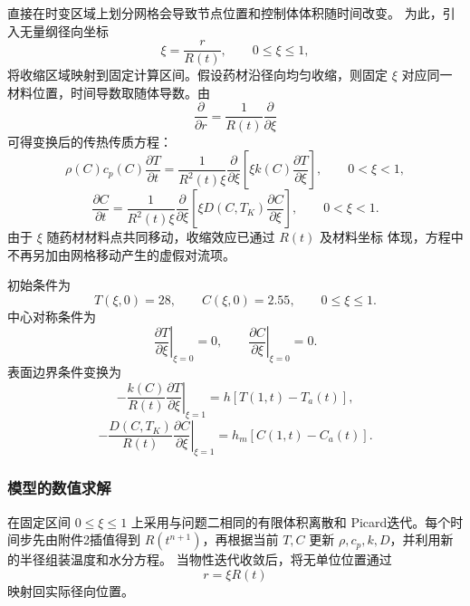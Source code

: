 \documentclass[12pt,a4paper]{article}
\begin{document}
直接在时变区域上划分网格会导致节点位置和控制体体积随时间改变。
为此，引入无量纲径向坐标
\begin{equation}
\xi=\frac{r}{R(t)},\qquad 0\leq\xi\leq1,
\label{eq:q4-coordinate}
\end{equation}
将收缩区域映射到固定计算区间。假设药材沿径向均匀收缩，则固定
$\xi$ 对应同一材料位置，时间导数取随体导数。由
\begin{equation}
\frac{\partial}{\partial r}
=\frac{1}{R(t)}\frac{\partial}{\partial\xi}
\end{equation}
可得变换后的传热传质方程：
\begin{equation}
\rho(C)c_p(C)\frac{\partial T}{\partial t}
=\frac{1}{R^2(t)\xi}
\frac{\partial}{\partial\xi}
\left[\xi k(C)\frac{\partial T}{\partial\xi}\right],
\qquad 0<\xi<1,
\label{eq:q4-heat}
\end{equation}
\begin{equation}
\frac{\partial C}{\partial t}
=\frac{1}{R^2(t)\xi}
\frac{\partial}{\partial\xi}
\left[\xi D(C,T_K)\frac{\partial C}{\partial\xi}\right],
\qquad 0<\xi<1.
\label{eq:q4-moisture}
\end{equation}
由于 $\xi$ 随药材材料点共同移动，收缩效应已通过 $R(t)$ 及材料坐标
体现，方程中不再另加由网格移动产生的虚假对流项。

初始条件为
\begin{equation}
T(\xi,0)=28,\qquad C(\xi,0)=2.55,
\qquad 0\leq\xi\leq1.
\label{eq:q4-initial}
\end{equation}
中心对称条件为
\begin{equation}
\left.\frac{\partial T}{\partial\xi}\right|_{\xi=0}=0,
\qquad
\left.\frac{\partial C}{\partial\xi}\right|_{\xi=0}=0.
\label{eq:q4-center}
\end{equation}
表面边界条件变换为
\begin{equation}
-\frac{k(C)}{R(t)}
\left.\frac{\partial T}{\partial\xi}\right|_{\xi=1}
=h[T(1,t)-T_a(t)],
\label{eq:q4-heat-bc}
\end{equation}
\begin{equation}
-\frac{D(C,T_K)}{R(t)}
\left.\frac{\partial C}{\partial\xi}\right|_{\xi=1}
=h_m[C(1,t)-C_a(t)].
\label{eq:q4-moisture-bc}
\end{equation}

\subsubsection{模型的数值求解}

在固定区间 $0\leq\xi\leq1$ 上采用与问题二相同的有限体积离散和
Picard迭代。每个时间步先由附件2插值得到 $R(t^{n+1})$，再根据当前
$T,C$ 更新 $\rho,c_p,k,D$，并利用新的半径组装温度和水分方程。
当物性迭代收敛后，将无单位位置通过
\begin{equation}
r=\xi R(t)
\label{eq:q4-back-transform}
\end{equation}
映射回实际径向位置。
\end{document}
